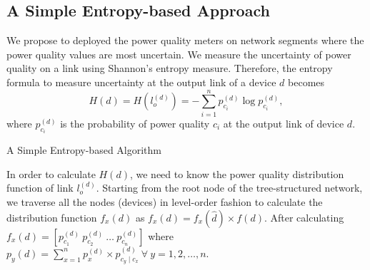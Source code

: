 \subsection{A Simple Entropy-based Approach}
\label{sec:simpleH}
We propose to deployed the power quality meters on network segments where the power quality values are most uncertain. We measure the uncertainty of power quality on a link using Shannon's entropy measure. Therefore, the entropy formula to measure uncertainty at the output link of a device $d$ becomes
\[H(d) = H(l_{o}^{(d)}) = -\sum_{i=1}^n p_{c_i}^{(d)} \log p_{c_i}^{(d)},\]
where $p_{c_i}^{(d)}$ is the probability of power quality $c_i$ at the output link of device $d$.

\begin{algorithm}[!p]
\vspace{0.2cm}

\vspace{0.2cm}\caption{A Simple Entropy-based Algorithm}\vspace{0.2cm} \label{algo-1}
\end{algorithm}

In order to calculate $H(d)$, we need to know the power quality distribution function of link $l_{o}^{(d)}$. Starting from the root node of the tree-structured network, we traverse all the nodes (devices) in level-order fashion to calculate the distribution function $f_{x}(d)$ as $f_{x}(d) = f_x(\hat d) \times f(d)$. After calculating $f_{x}(d) = [p_{c_1}^{(d)} \ p_{c_2}^{(d)} \ \dots \ p_{c_n}^{(d)}]$ where $p_y(d) = \sum_{x=1}^n p_x^{(d)} \times p_{c_y \mid c_x}^{(d)} \ \forall \ y = 1,2,\dots,n$.

